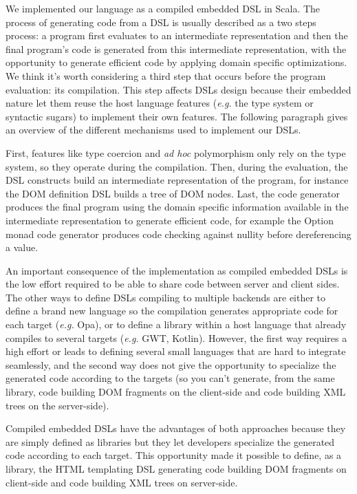 \documentclass[american,english,runningheads]{llncs}
\newcommand{\eg}{\emph{e.g.}}
\begin{document}
We implemented our language as a compiled embedded DSL in Scala. The process of generating code from a DSL is usually
described as a two steps process: a program first evaluates to an intermediate representation and then the final
program’s code is generated from this intermediate representation, with the opportunity to generate efficient code
by applying domain specific optimizations. We think it’s worth considering a third step that occurs before the
program evaluation: its compilation. This step affects DSLs design because their embedded nature let them reuse the
host language features (\eg{} the type system or syntactic sugars) to implement their own features. The following
paragraph gives an overview of the different mechanisms used to implement our DSLs.

First, features like type coercion and \emph{ad hoc} polymorphism only rely on the type system, so they operate during
the compilation. Then, during the evaluation, the DSL constructs build an intermediate representation of the program,
for instance the DOM definition DSL builds a tree of DOM nodes. Last, the code generator produces the final program
using the domain specific information available in the intermediate representation to generate efficient code, for
example the Option monad code generator produces code checking against nullity before dereferencing a value.

An important consequence of the implementation as compiled embedded DSLs is the low effort required to be able to
share code between server and client sides. The other ways to define DSLs compiling to multiple backends are either
to define a brand new language so the compilation generates appropriate code for each target (\eg{} Opa), or to
define a library within a host language that already compiles to several targets (\eg{} GWT, Kotlin). However, the
first way requires a high effort or leads to defining several small languages that are hard to integrate seamlessly,
and the second way does not give the opportunity to specialize the generated code according to the targets (so you
can’t generate, from the same library, code building DOM fragments on the client-side and code building XML trees on
the server-side).

Compiled embedded DSLs have the advantages of both approaches because they are simply defined as libraries but they
let developers specialize the generated code according to each target. This opportunity made it possible to define,
as a library, the HTML templating DSL generating code building DOM fragments on client-side and code building XML
trees on server-side.
\end{document}

